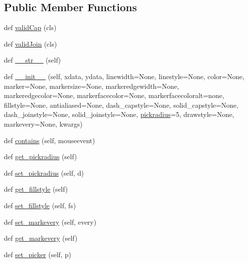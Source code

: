 \subsection*{Public Member Functions}
\begin{DoxyCompactItemize}
\item 
def \hyperlink{classmatplotlib_1_1lines_1_1Line2D_a580bae1677d2bc5760eae403996d54c6}{valid\+Cap} (cls)
\item 
def \hyperlink{classmatplotlib_1_1lines_1_1Line2D_ac6f994d4500cabc9d8f34b43b2579fe6}{valid\+Join} (cls)
\item 
def \hyperlink{classmatplotlib_1_1lines_1_1Line2D_af5474a0851ed0ef333ca732b21c26f3e}{\+\_\+\+\_\+str\+\_\+\+\_\+} (self)
\item 
def \hyperlink{classmatplotlib_1_1lines_1_1Line2D_ac8fbafde2dbca785493d2eeefa1540b9}{\+\_\+\+\_\+init\+\_\+\+\_\+} (self, xdata, ydata, linewidth=None, linestyle=None, color=None, marker=None, markersize=None, markeredgewidth=None, markeredgecolor=None, markerfacecolor=None, markerfacecoloralt=\textquotesingle{}none\textquotesingle{}, fillstyle=None, antialiased=None, dash\+\_\+capstyle=None, solid\+\_\+capstyle=None, dash\+\_\+joinstyle=None, solid\+\_\+joinstyle=None, \hyperlink{classmatplotlib_1_1lines_1_1Line2D_ad384465e5db045c5caccc38bf84a2a8d}{pickradius}=5, drawstyle=None, markevery=None, kwargs)
\item 
def \hyperlink{classmatplotlib_1_1lines_1_1Line2D_a6e150da55177aacda6cab646155100c2}{contains} (self, mouseevent)
\item 
def \hyperlink{classmatplotlib_1_1lines_1_1Line2D_ad45a36309becae396671597a8d95f242}{get\+\_\+pickradius} (self)
\item 
def \hyperlink{classmatplotlib_1_1lines_1_1Line2D_a55175911cf70d74606fcefd4047c8321}{set\+\_\+pickradius} (self, d)
\item 
def \hyperlink{classmatplotlib_1_1lines_1_1Line2D_a413092f0dc741ef10d54dc11c8e5ecf0}{get\+\_\+fillstyle} (self)
\item 
def \hyperlink{classmatplotlib_1_1lines_1_1Line2D_a183ef5c94394468c6dd3e1921e094d5f}{set\+\_\+fillstyle} (self, fs)
\item 
def \hyperlink{classmatplotlib_1_1lines_1_1Line2D_a09612714c46e6acb352d45b217f267d2}{set\+\_\+markevery} (self, every)
\item 
def \hyperlink{classmatplotlib_1_1lines_1_1Line2D_a14f455a0410237497d3b306ca91bc010}{get\+\_\+markevery} (self)
\item 
def \hyperlink{classmatplotlib_1_1lines_1_1Line2D_a635055a54a543aef83e5c8f4c3eb2179}{set\+\_\+picker} (self, p)

\end{DoxyCompactItemize}
